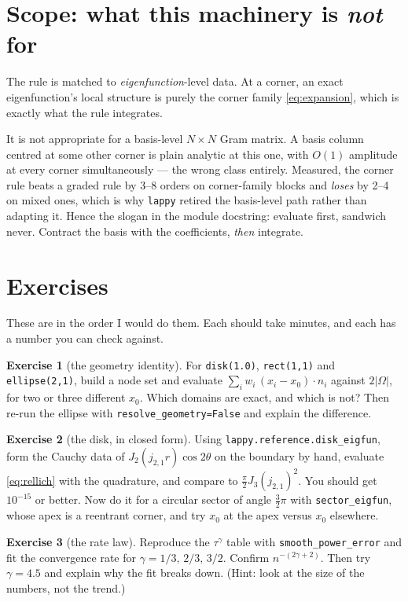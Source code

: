 \documentclass[11pt]{article}
\theoremstyle{definition}
\newtheorem{exercise}{Exercise}
\theoremstyle{remark}
\newcommand{\Om}{\Omega}
\newcommand{\code}[1]{\texttt{#1}}
\begin{document}
\section{Scope: what this machinery is \emph{not} for}\label{sec:scope}

The rule is matched to \emph{eigenfunction}-level data. At a corner, an exact
eigenfunction's local structure is purely the corner family \eqref{eq:expansion},
which is exactly what the rule integrates.

It is not appropriate for a basis-level $N\times N$ Gram matrix. A basis column
centred at some other corner is plain analytic at this one, with $O(1)$ amplitude
at every corner simultaneously --- the wrong class entirely. Measured, the corner
rule beats a graded rule by 3--8 orders on corner-family blocks and \emph{loses}
by 2--4 on mixed ones, which is why \code{lappy} retired the basis-level path
rather than adapting it. Hence the slogan in the module docstring: evaluate
first, sandwich never. Contract the basis with the coefficients, \emph{then}
integrate.

\section{Exercises}

These are in the order I would do them. Each should take minutes, and each has a
number you can check against.

\begin{exercise}[the geometry identity]
For \code{disk(1.0)}, \code{rect(1,1)} and \code{ellipse(2,1)}, build a node set
and evaluate $\sum_i w_i\,(x_i-x_0)\cdot n_i$ against $2|\Om|$, for two or three
different $x_0$. Which domains are exact, and which is not? Then re-run the
ellipse with \code{resolve\_geometry=False} and explain the difference.
\end{exercise}

\begin{exercise}[the disk, in closed form]
Using \code{lappy.reference.disk\_eigfun}, form the Cauchy data of $J_2(j_{2,1}r)\cos2\theta$
on the boundary by hand, evaluate \eqref{eq:rellich} with the quadrature, and
compare to $\tfrac{\pi}{2}J_3(j_{2,1})^2$. You should get $10^{-15}$ or better.
Now do it for a circular sector of angle $\tfrac32\pi$ with
\code{sector\_eigfun}, whose apex is a reentrant corner, and try $x_0$ at the
apex versus $x_0$ elsewhere.
\end{exercise}

\begin{exercise}[the rate law]
Reproduce the $\tau^\gamma$ table with \code{smooth\_power\_error} and fit the
convergence rate for $\gamma=1/3,\,2/3,\,3/2$. Confirm $n^{-(2\gamma+2)}$. Then
try $\gamma=4.5$ and explain why the fit breaks down. (Hint: look at the size of
the numbers, not the trend.)
\end{exercise}
\end{document}
